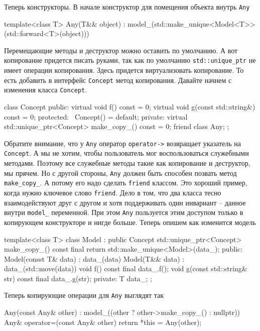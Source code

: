 Теперь конструкторы.
В начале конструктор для помещения объекта внутрь \verb"Any"
\begin{cppcode}
template<class T>
Any(T&& object) : model_(std::make_unique<Model<T>>(std::forward<T>(object))) {}
\end{cppcode}
Перемещающие методы и деструктор можно оставить по умолчанию.
А вот копирование придется писать руками, так как по умолчанию \verb"std::unique_ptr" не имеет операции копирования.
Здесь придется виртуализовать копирование.
То есть добавить в интерфейс \verb"Concept" метод копирования.
Давайте начнем с изменения класса \verb"Concept".
\begin{cppcode}
class Concept {
public:
  virtual void f() const = 0;
  virtual void g(const std::string&) const = 0;
protected:
  ~Concept() = default;
private:
  virtual std::unique_ptr<Concept> make_copy_() const = 0;
  friend class Any;
};
\end{cppcode}
Обратите внимание, что у \verb"Any" оператор \verb"operator->" возвращает указатель на \verb"Concept".
А мы не хотим, чтобы пользователь мог воспользоваться служебными методами.
Поэтому все служебные методы такие как копирование и деструктор, мы прячем.
Но с другой стороны, \verb"Any" должен быть способен позвать метод \verb"make_copy_".
А потому его надо сделать \verb"friend" классом.
Это хороший пример, когда нужно ключевое слово \verb"friend".
Дело в том, что два класса тесно взаимодействуют друг с другом и хотя поддерживать один инвариант -- данное внутри \verb"model_" переменной.
При этом \verb"Any" пользуется этим доступом только в копирующем конструкторе и нигде больше.
Теперь опишем как изменится модель
\begin{cppcode}
template<class T>
class Model : public Concept {
  std::unique_ptr<Concept> make_copy_() const final {
    return std::make_unique<Model>(data_);
  }
public:
  Model(consst T& data) : data_(data) {}
  Model(T&& data) : data_(std::move(data)) {}
  void f() const final {
    data_.f();
  }
  void g(const std::string& str) const final {
    data_.g(str);
  }
private:
  T data_;
};
\end{cppcode}
Теперь копирующие операции для \verb"Any" выглядят так
\begin{cppcode}
Any(const Any& other)
  : model_((other ? other->make_copy_() : nullptr)) {}
Any& operator=(const Any& other) {
  return *this = Any(other);
}
\end{cppcode}



